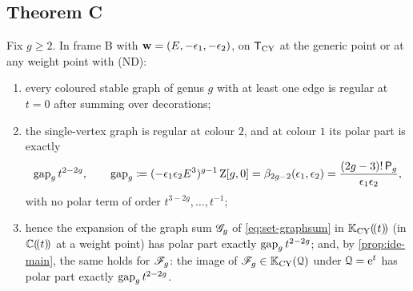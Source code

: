 \subsection{Theorem C}
\label{sec:reg-thmC}

\begin{cor}
\label{cor:reg-main}
Fix $g\geq 2$. In frame B with $\mathbf{w}=(E,-\epsilon_1,-\epsilon_2)$, on $\mathsf{T}_{\mathrm{CY}}$ at the generic point or at any weight point with (ND):
\begin{enumerate}
\item[(a)] every coloured stable graph of genus $g$ with at least one edge is regular at $t=0$ after summing over decorations;
\item[(b)] the single-vertex graph is regular at colour $2$, and at colour $1$ its polar part is exactly
\begin{equation}
\label{eq:reg-gap}
\mathrm{gap}_g\,t^{2-2g},\qquad
\mathrm{gap}_g\coloneqq(-\epsilon_1\epsilon_2E^3)^{g-1}\,\mathrm{Z}[g,0]=\beta_{2g-2}(\epsilon_1,\epsilon_2)=\frac{(2g-3)!\,\mathsf{P}_{g}}{\epsilon_1\epsilon_2},
\end{equation}
with no polar term of order $t^{3-2g},\dots,t^{-1}$;
\item[(c)] hence the expansion of the graph sum $\mathscr{G}_g$ of \cref{eq:set-graphsum} in $\mathbb{K}_{\mathrm{CY}}(\!(t)\!)$ (in $\mathbb{C}(\!(t)\!)$ at a weight point) has polar part exactly $\mathrm{gap}_g\,t^{2-2g}$; and, by \cref{prop:ide-main}, the same holds for $\mathscr{F}_g$: the image of $\mathscr{F}_g\in\mathbb{K}_{\mathrm{CY}}(\mathcal{Q})$ under $\mathcal{Q}=\mathrm{e}^{t}$ has polar part exactly $\mathrm{gap}_g\,t^{2-2g}$.
\end{enumerate}
\end{cor}

